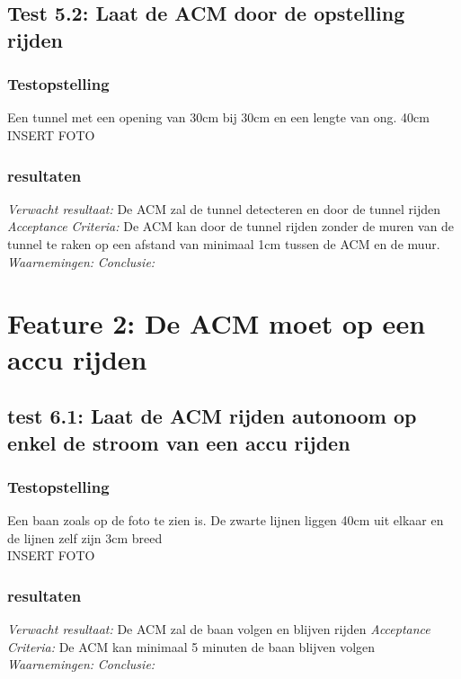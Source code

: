 \documentclass{article}
\begin{document}
\subsection{Test 5.2: Laat de ACM door de opstelling rijden}
\subsubsection{Testopstelling}
Een tunnel met een opening van 30cm bij 30cm en een lengte van ong. 40cm\\
INSERT FOTO
\subsubsection{resultaten}
\textit{Verwacht resultaat: }De ACM zal de tunnel detecteren en door de tunnel rijden
\newline
\textit{Acceptance Criteria: }De ACM kan door de tunnel rijden zonder de muren van de tunnel te raken op een afstand van minimaal 1cm tussen de ACM en de muur. 
\newline
\textit{Waarnemingen: }
\newline
\textit{Conclusie: }


\section{Feature 2: De ACM moet op een accu rijden}
\subsection{test 6.1: Laat de ACM rijden autonoom op enkel de stroom van een accu rijden}
\subsubsection{Testopstelling}
Een baan zoals op de foto te zien is. De zwarte lijnen liggen 40cm uit elkaar en de lijnen zelf zijn 3cm breed\\
INSERT FOTO
\subsubsection{resultaten}
\textit{Verwacht resultaat: } De ACM zal de baan volgen en blijven rijden
\newline
\textit{Acceptance Criteria: }De ACM kan minimaal 5 minuten de baan blijven volgen   
\newline
\textit{Waarnemingen: }
\newline
\textit{Conclusie: }
\end{document}
